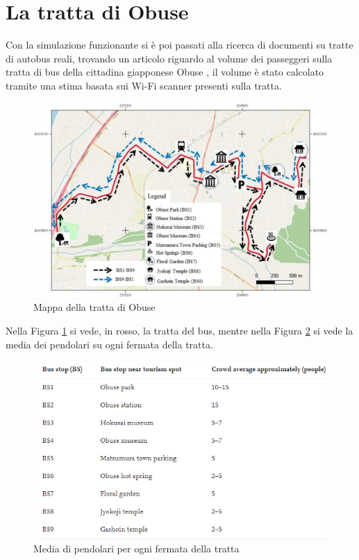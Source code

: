 \documentclass[12pt, openany]{book}
\begin{document}
 	\section{La tratta di Obuse}
 	Con la simulazione funzionante si è poi passati alla ricerca di documenti su tratte di autobus reali, trovando un articolo riguardo al volume dei passeggeri sulla tratta di bus della cittadina giapponese Obuse  \cite{Obuse}, il volume è stato calcolato tramite una stima basata sui Wi-Fi scanner presenti sulla tratta.
 	\begin{figure}[H]
 		\centering
 		\includegraphics[width=1\linewidth]{"Immagini/MappaObuse.jpg"}
 		\caption{Mappa della tratta di Obuse}
 		\label{fig:Map}
 	\end{figure}
 	Nella Figura \ref{fig:Map} si vede, in rosso, la tratta del bus, mentre nella Figura \ref{fig:Pendolari} si vede la media dei pendolari su ogni fermata della tratta.
 	\begin{figure}[H]
 		\centering
 		\includegraphics[width=1\linewidth]{"Immagini/MediaPendolari.png"}
 		\caption{Media di pendolari per ogni fermata della tratta}
 		\label{fig:Pendolari}
 	\end{figure}
\end{document}
